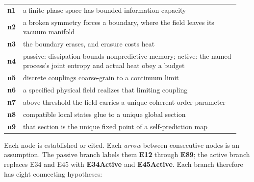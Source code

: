 \documentclass[11pt]{article}
\begin{document}
\begin{center}
\begin{tabular}{@{}p{0.05\linewidth}p{0.89\linewidth}@{}}
\textbf{n1} & a finite phase space has bounded information capacity \\
\textbf{n2} & a broken symmetry forces a boundary, where the field leaves its vacuum manifold \\
\textbf{n3} & the boundary erases, and erasure costs heat \\
\textbf{n4} & passive: dissipation bounds nonpredictive memory; active: the named process's joint entropy and actual heat obey a budget \\
\textbf{n5} & discrete couplings coarse-grain to a continuum limit \\
\textbf{n6} & a specified physical field realizes that limiting coupling \\
\textbf{n7} & above threshold the field carries a unique coherent order parameter \\
\textbf{n8} & compatible local states glue to a unique global section \\
\textbf{n9} & that section is the unique fixed point of a self-prediction map \\
\end{tabular}
\end{center}

\noindent
Each node is established or cited. Each \emph{arrow} between consecutive
nodes is an assumption. The passive branch labels them \textbf{E12} through
\textbf{E89}; the active branch replaces E34 and E45 with \textbf{E34Active}
and \textbf{E45Active}. Each branch therefore has eight connecting hypotheses:
\end{document}
